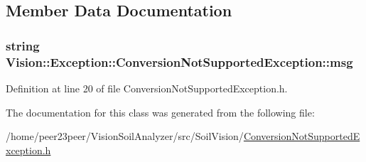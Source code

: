 \subsection{Member Data Documentation}
\hypertarget{class_vision_1_1_exception_1_1_conversion_not_supported_exception_a1cd5dd7edfb67cf5055374402b846daa}{}
\subsubsection[{msg}]{\setlength{\rightskip}{0pt plus 5cm}string Vision\+::\+Exception\+::\+Conversion\+Not\+Supported\+Exception\+::msg\hspace{0.3cm}{\ttfamily [private]}}\label{class_vision_1_1_exception_1_1_conversion_not_supported_exception_a1cd5dd7edfb67cf5055374402b846daa}


Definition at line 20 of file Conversion\+Not\+Supported\+Exception.\+h.



The documentation for this class was generated from the following file\+:\begin{DoxyCompactItemize}
\item 
/home/peer23peer/\+Vision\+Soil\+Analyzer/src/\+Soil\+Vision/\hyperlink{_conversion_not_supported_exception_8h}{Conversion\+Not\+Supported\+Exception.\+h}\end{DoxyCompactItemize}
